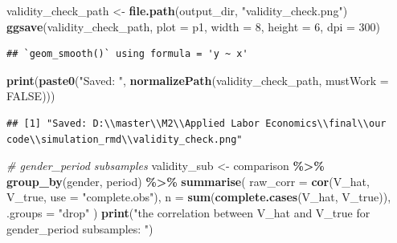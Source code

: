 \documentclass[
]{article}
\newenvironment{Shaded}{\begin{snugshade}}{\end{snugshade}}
\newcommand{\AttributeTok}[1]{\textcolor[rgb]{0.13,0.29,0.53}{#1}}
\newcommand{\CommentTok}[1]{\textcolor[rgb]{0.56,0.35,0.01}{\textit{#1}}}
\newcommand{\ConstantTok}[1]{\textcolor[rgb]{0.56,0.35,0.01}{#1}}
\newcommand{\DecValTok}[1]{\textcolor[rgb]{0.00,0.00,0.81}{#1}}
\newcommand{\FunctionTok}[1]{\textcolor[rgb]{0.13,0.29,0.53}{\textbf{#1}}}
\newcommand{\NormalTok}[1]{#1}
\newcommand{\OtherTok}[1]{\textcolor[rgb]{0.56,0.35,0.01}{#1}}
\newcommand{\SpecialCharTok}[1]{\textcolor[rgb]{0.81,0.36,0.00}{\textbf{#1}}}
\newcommand{\StringTok}[1]{\textcolor[rgb]{0.31,0.60,0.02}{#1}}
\begin{document}
\begin{Shaded}
\begin{Highlighting}[]
\NormalTok{validity\_check\_path }\OtherTok{\textless{}{-}} \FunctionTok{file.path}\NormalTok{(output\_dir, }\StringTok{"validity\_check.png"}\NormalTok{)}
\FunctionTok{ggsave}\NormalTok{(validity\_check\_path, }\AttributeTok{plot =}\NormalTok{ p1, }\AttributeTok{width =} \DecValTok{8}\NormalTok{, }\AttributeTok{height =} \DecValTok{6}\NormalTok{, }\AttributeTok{dpi =} \DecValTok{300}\NormalTok{)}
\end{Highlighting}
\end{Shaded}

\begin{verbatim}
## `geom_smooth()` using formula = 'y ~ x'
\end{verbatim}

\begin{Shaded}
\begin{Highlighting}[]
\FunctionTok{print}\NormalTok{(}\FunctionTok{paste0}\NormalTok{(}\StringTok{"Saved: "}\NormalTok{, }\FunctionTok{normalizePath}\NormalTok{(validity\_check\_path, }\AttributeTok{mustWork =} \ConstantTok{FALSE}\NormalTok{)))}
\end{Highlighting}
\end{Shaded}

\begin{verbatim}
## [1] "Saved: D:\\master\\M2\\Applied Labor Economics\\final\\our code\\simulation_rmd\\validity_check.png"
\end{verbatim}

\begin{Shaded}
\begin{Highlighting}[]
\CommentTok{\# gender\_period subsamples}
\NormalTok{validity\_sub }\OtherTok{\textless{}{-}}\NormalTok{ comparison }\SpecialCharTok{\%\textgreater{}\%}
    \FunctionTok{group\_by}\NormalTok{(gender, period) }\SpecialCharTok{\%\textgreater{}\%}
    \FunctionTok{summarise}\NormalTok{(}
        \AttributeTok{raw\_corr =} \FunctionTok{cor}\NormalTok{(V\_hat, V\_true, }\AttributeTok{use =} \StringTok{"complete.obs"}\NormalTok{),}
        \AttributeTok{n =} \FunctionTok{sum}\NormalTok{(}\FunctionTok{complete.cases}\NormalTok{(V\_hat, V\_true)),}
        \AttributeTok{.groups =} \StringTok{"drop"}
\NormalTok{    )}
\FunctionTok{print}\NormalTok{(}\StringTok{"the correlation between V\_hat and V\_true for gender\_period subsamples: "}\NormalTok{)}
\end{Highlighting}
\end{Shaded}
\end{document}
